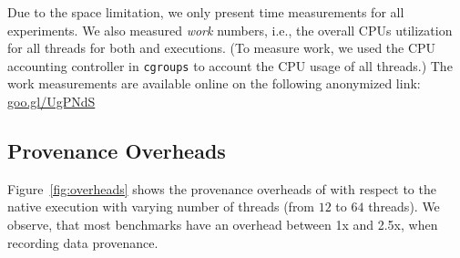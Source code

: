  Due to the space limitation, we only present  time measurements for all experiments. We also measured  {\em work} numbers, i.e., the overall CPUs utilization for all threads for both \pthreads and \projecttitle executions. (To measure work, we used the CPU accounting controller in {\tt cgroups} to account the CPU usage of all threads.) The work measurements are available online on the following anonymized link:  \href{https://goo.gl/UgPNdS}{goo.gl/UgPNdS}





\subsection{Provenance Overheads}
\label{subsec:overheads}

Figure~\ref{fig:overheads} shows the provenance overheads of \projecttitle with respect to the native \pthreads execution with varying number of
threads (from $12$ to $64$ threads). We observe, that most benchmarks have an
overhead between 1x and 2.5x, when recording data provenance.

